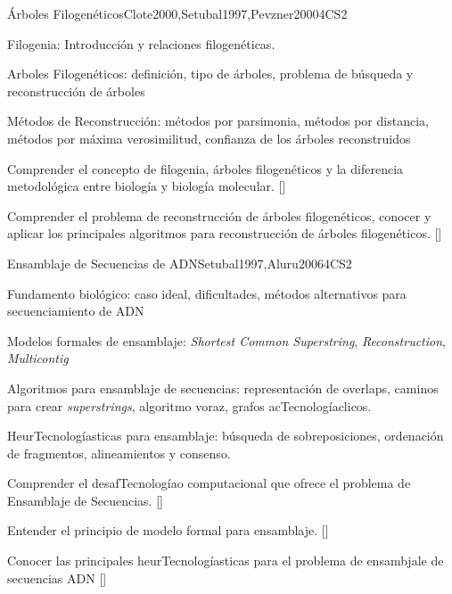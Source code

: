 \begin{syllabus}
\begin{unit}{Árboles Filogenéticos}{}{Clote2000,Setubal1997,Pevzner2000}{4}{CS2}
\begin{topics}
\item Filogenia: Introducción y relaciones filogenéticas.
\item Arboles Filogenéticos: definición, tipo de árboles, problema de búsqueda y reconstrucción de árboles
\item Métodos de Reconstrucción: métodos por parsimonia, métodos por distancia, métodos por máxima verosimilitud, confianza de los árboles reconstruidos
\end{topics}

\begin{learningoutcomes}
\item  Comprender el concepto de filogenia, árboles filogenéticos y la diferencia metodológica entre biología y biología molecular. [\Familiarity]
\item Comprender el problema de reconstrucción de árboles filogenéticos, conocer y aplicar los principales algoritmos para reconstrucción de árboles filogenéticos. [\Assessment]
\end{learningoutcomes}
\end{unit}

\begin{unit}{Ensamblaje de Secuencias de ADN}{}{Setubal1997,Aluru2006}{4}{CS2}
\begin{topics}
\item Fundamento biológico: caso ideal, dificultades, métodos alternativos para secuenciamiento de ADN
\item Modelos formales de ensamblaje: \textit{Shortest Common Superstring}, \textit{Reconstruction}, \textit{Multicontig}
\item Algoritmos para ensamblaje de secuencias: representación de overlaps, caminos para crear \textit{superstrings}, algoritmo voraz, grafos acTecnologíaclicos.
\item HeurTecnologíasticas para ensamblaje: búsqueda de sobreposiciones, ordenación de fragmentos, alineamientos y consenso.
\end{topics}

\begin{learningoutcomes}
\item Comprender el desafTecnologíao computacional que ofrece el problema de Ensamblaje de Secuencias. [\Familiarity]
\item Entender el principio de modelo formal para ensamblaje. [\Assessment]
\item Conocer las principales heurTecnologíasticas para el problema de ensambjale de secuencias ADN [\Usage]
\end{learningoutcomes}
\end{unit}


\end{syllabus}
